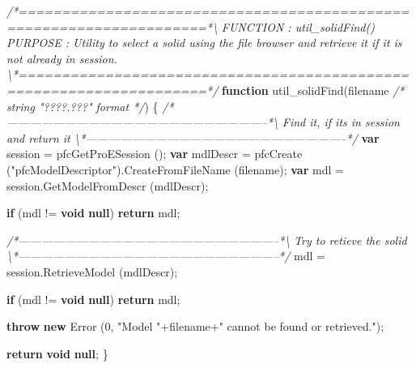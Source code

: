 \documentclass[]{article}
\newenvironment{Shaded}{}{}
\newcommand{\KeywordTok}[1]{\textcolor[rgb]{0.00,0.44,0.13}{\textbf{{#1}}}}
\newcommand{\DecValTok}[1]{\textcolor[rgb]{0.25,0.63,0.44}{{#1}}}
\newcommand{\StringTok}[1]{\textcolor[rgb]{0.25,0.44,0.63}{{#1}}}
\newcommand{\CommentTok}[1]{\textcolor[rgb]{0.38,0.63,0.69}{\textit{{#1}}}}
\newcommand{\OtherTok}[1]{\textcolor[rgb]{0.00,0.44,0.13}{{#1}}}
\newcommand{\FunctionTok}[1]{\textcolor[rgb]{0.02,0.16,0.49}{{#1}}}
\newcommand{\NormalTok}[1]{{#1}}
\begin{document}
\begin{Shaded}
\begin{Highlighting}[]
\CommentTok{/*====================================================================*\textbackslash{} }
\CommentTok{FUNCTION : util_solidFind()}
\CommentTok{PURPOSE  : Utility to select a solid using the file browser and retrieve}
\CommentTok{           it if it is not already in session.}
\CommentTok{\textbackslash{}*====================================================================*/} 
\KeywordTok{function} \FunctionTok{util_solidFind}\NormalTok{(filename }\CommentTok{/* string "????.???" format */}\NormalTok{)}
\NormalTok{\{}
\CommentTok{/*--------------------------------------------------------------------*\textbackslash{} }
\CommentTok{   Find it, if its in session and return it}
\CommentTok{\textbackslash{}*--------------------------------------------------------------------*/}
  \KeywordTok{var} \NormalTok{session = }\FunctionTok{pfcGetProESession} \NormalTok{();}
  \KeywordTok{var} \NormalTok{mdlDescr = }
    \FunctionTok{pfcCreate} \NormalTok{(}\StringTok{"pfcModelDescriptor"}\NormalTok{).}\FunctionTok{CreateFromFileName} \NormalTok{(filename);}
  \KeywordTok{var} \NormalTok{mdl = }\OtherTok{session}\NormalTok{.}\FunctionTok{GetModelFromDescr} \NormalTok{(mdlDescr);}
  
  \KeywordTok{if} \NormalTok{(mdl != }\KeywordTok{void} \KeywordTok{null}\NormalTok{)}
    \KeywordTok{return} \NormalTok{mdl;}
  
\CommentTok{/*--------------------------------------------------------------------*\textbackslash{}     }
\CommentTok{  Try to retieve the solid }
\CommentTok{\textbackslash{}*--------------------------------------------------------------------*/} 
  \NormalTok{mdl = }\OtherTok{session}\NormalTok{.}\FunctionTok{RetrieveModel} \NormalTok{(mdlDescr);}
  
  \KeywordTok{if} \NormalTok{(mdl != }\KeywordTok{void} \KeywordTok{null}\NormalTok{)}
    \KeywordTok{return} \NormalTok{mdl;}
  
  \KeywordTok{throw} \KeywordTok{new} \FunctionTok{Error} \NormalTok{(}\DecValTok{0}\NormalTok{, }
           \StringTok{"Model "}\NormalTok{+filename+}\StringTok{" cannot be found or retrieved."}\NormalTok{);}
  
  \KeywordTok{return} \KeywordTok{void} \KeywordTok{null}\NormalTok{;}
\NormalTok{\}}



\end{Highlighting}
\end{Shaded}
\end{document}
